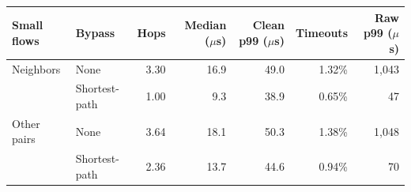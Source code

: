 \begin{tabular}{@{}llrrrrr@{}}
\toprule
Small flows & Bypass & Hops & Median ($\mu$s) & Clean p99 ($\mu$s) & Timeouts & Raw p99 ($\mu$s) \\
\midrule
Neighbors & None & 3.30 & 16.9 & 49.0 & 1.32\% & 1{,}043 \\
 & Shortest-path & 1.00 & 9.3 & 38.9 & 0.65\% & 47 \\
\midrule
Other pairs & None & 3.64 & 18.1 & 50.3 & 1.38\% & 1{,}048 \\
 & Shortest-path & 2.36 & 13.7 & 44.6 & 0.94\% & 70 \\
\bottomrule
\end{tabular}
